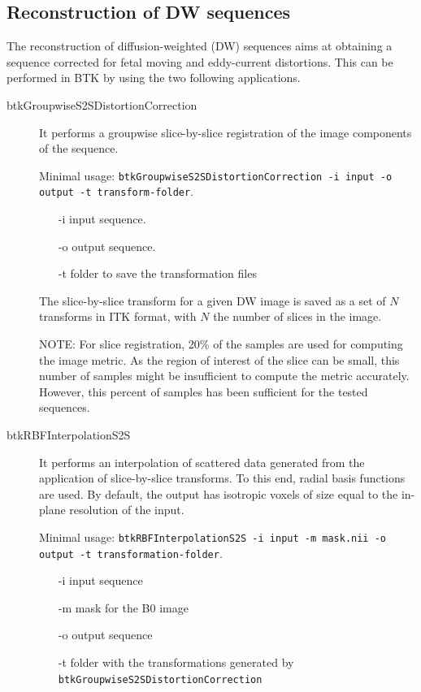 \subsection{Reconstruction of DW sequences \cite{oubel_reconstruction_2010}}
\label{subsec:diff_rec}
The reconstruction of diffusion-weighted (DW) sequences aims at
obtaining a sequence corrected for fetal moving and eddy-current distortions.
This can be performed in BTK by using the two following applications. 
\begin{description}
\item[btkGroupwiseS2SDistortionCorrection] It performs a groupwise
slice-by-slice registration of the image components of the sequence.

Minimal usage: \texttt{btkGroupwiseS2SDistortionCorrection -i input -o
output -t transform-folder}.

\begin{itemize}
 \item[-i] input sequence.
 \item[-o] output sequence.
 \item[-t] folder to save the transformation files
\end{itemize}

The slice-by-slice transform for a given DW image is saved as a set of $N$
transforms in ITK format, with $N$ the number of slices in the image.

NOTE: For slice registration, 20\% of the samples are used for computing the
image metric. As the region of interest of the slice can be small, this number
of samples might be insufficient to compute the metric accurately. However,
this percent of samples has been sufficient for the tested sequences. 

\item[btkRBFInterpolationS2S] It performs an interpolation of scattered data
generated from the application of slice-by-slice transforms. To this end,
radial basis functions are used. By default, the output has isotropic
voxels of size equal to the in-plane resolution of the input.

Minimal usage: \texttt{btkRBFInterpolationS2S -i input -m mask.nii -o output
-t transformation-folder}.

\begin{itemize}
 \item[-i] input sequence
 \item[-m] mask for the B0 image
 \item[-o] output sequence 
 \item[-t] folder with the transformations generated by
\texttt{btkGroupwiseS2SDistortionCorrection}
\end{itemize}

\end{description}


